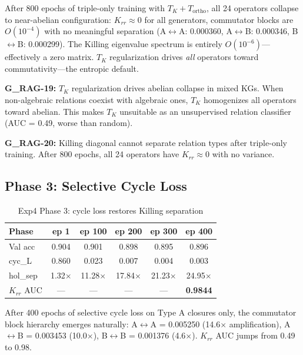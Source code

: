 \documentclass[11pt,letterpaper]{article}
\begin{document}
After 800 epochs of triple-only training with $T_K + T_{\text{ortho}}$, all 24 operators collapse to near-abelian configuration: $K_{rr} \approx 0$ for all generators, commutator blocks are $O(10^{-4})$ with no meaningful separation (A$\leftrightarrow$A: 0.000360, A$\leftrightarrow$B: 0.000346, B$\leftrightarrow$B: 0.000299). The Killing eigenvalue spectrum is entirely $O(10^{-6})$---effectively a zero matrix. $T_K$ regularization drives \textit{all} operators toward commutativity---the entropic default.

\textbf{G\_RAG-19:} $T_K$ regularization drives abelian collapse in mixed KGs. When non-algebraic relations coexist with algebraic ones, $T_K$ homogenizes all operators toward abelian. This makes $T_K$ unsuitable as an unsupervised relation classifier (AUC = 0.49, worse than random).

\textbf{G\_RAG-20:} Killing diagonal cannot separate relation types after triple-only training. After 800 epochs, all 24 operators have $K_{rr} \approx 0$ with no variance.

\subsection{Phase 3: Selective Cycle Loss}

\begin{table}[H]
\centering
\caption{Exp4 Phase 3: cycle loss restores Killing separation}
\begin{tabular}{@{}lccccc@{}}
\toprule
\textbf{Phase} & \textbf{ep 1} & \textbf{ep 100} & \textbf{ep 200} & \textbf{ep 300} & \textbf{ep 400} \\
\midrule
Val acc & 0.904 & 0.901 & 0.898 & 0.895 & 0.896 \\
cyc\_L & 0.860 & 0.023 & 0.007 & 0.004 & 0.003 \\
hol\_sep & 1.32$\times$ & 11.28$\times$ & 17.84$\times$ & 21.23$\times$ & 24.95$\times$ \\
$K_{rr}$ AUC & --- & --- & --- & --- & \textbf{0.9844} \\
\bottomrule
\end{tabular}
\end{table}

After 400 epochs of selective cycle loss on Type A closures only, the commutator block hierarchy emerges naturally: A$\leftrightarrow$A = 0.005250 (14.6$\times$ amplification), A$\leftrightarrow$B = 0.003453 (10.0$\times$), B$\leftrightarrow$B = 0.001376 (4.6$\times$). $K_{rr}$ AUC jumps from 0.49 to 0.98.
\end{document}
